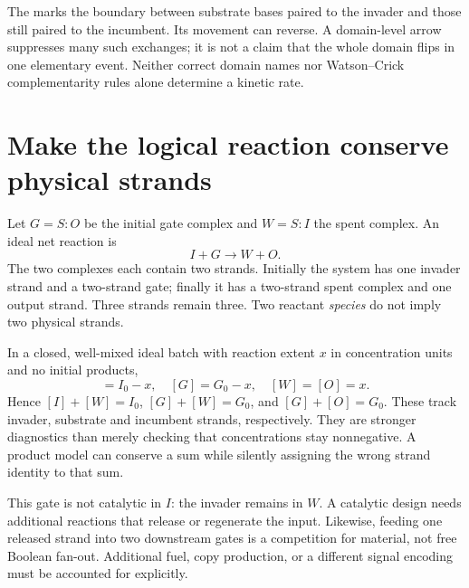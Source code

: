 The  marks the boundary between substrate bases paired to
the invader and those still paired to the incumbent. Its movement can reverse.
A domain-level arrow suppresses many such exchanges; it is not a claim that
the whole domain flips in one elementary event. Neither correct domain names
nor Watson--Crick complementarity rules alone determine a kinetic rate.

\section{Make the logical reaction conserve physical strands}
Let $G=S{:}O$ be the initial gate complex and $W=S{:}I$ the spent complex.
An ideal net reaction is
\begin{equation}
 I+G\longrightarrow W+O.
 \label{eq:net}
\end{equation}
The two complexes each contain two strands. Initially the system has one
invader strand and a two-strand gate; finally it has a two-strand spent complex
and one output strand. Three strands remain three. Two reactant \emph{species}
do not imply two physical strands.

In a closed, well-mixed ideal batch with reaction extent $x$ in concentration
units and no initial products,
\begin{equation}
 [I]=I_0-x,\quad [G]=G_0-x,\quad [W]=[O]=x.
 \label{eq:inventory}
\end{equation}
Hence $[I]+[W]=I_0$, $[G]+[W]=G_0$, and $[G]+[O]=G_0$.
These track invader, substrate and incumbent strands, respectively. They are
stronger diagnostics than merely checking that concentrations stay nonnegative.
A product model can conserve a sum while silently assigning the wrong strand
identity to that sum.


This gate is not catalytic in $I$: the invader remains in $W$. A catalytic
design needs additional reactions that release or regenerate the input.
Likewise, feeding one released strand into two downstream gates is a competition
for material, not free Boolean fan-out. Additional fuel, copy production, or
a different signal encoding must be accounted for explicitly.


